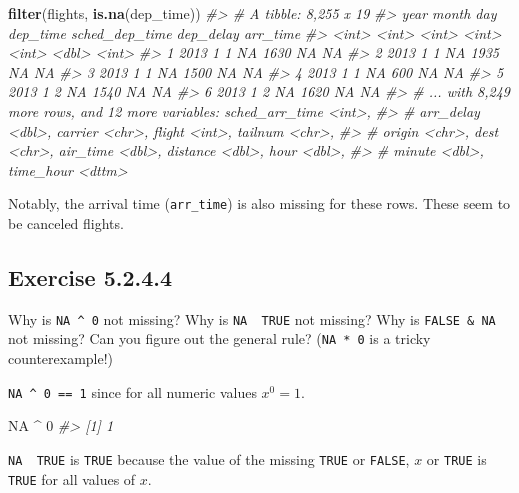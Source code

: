 \documentclass[]{book}
\newenvironment{Shaded}{\begin{snugshade}}{\end{snugshade}}
\newcommand{\CommentTok}[1]{\textcolor[rgb]{0.56,0.35,0.01}{\textit{#1}}}
\newcommand{\DecValTok}[1]{\textcolor[rgb]{0.00,0.00,0.81}{#1}}
\newcommand{\KeywordTok}[1]{\textcolor[rgb]{0.13,0.29,0.53}{\textbf{#1}}}
\newcommand{\NormalTok}[1]{#1}
\newcommand{\OperatorTok}[1]{\textcolor[rgb]{0.81,0.36,0.00}{\textbf{#1}}}
\newcommand{\OtherTok}[1]{\textcolor[rgb]{0.56,0.35,0.01}{#1}}
\newcommand{\StringTok}[1]{\textcolor[rgb]{0.31,0.60,0.02}{#1}}
\theoremstyle{plain}
\theoremstyle{remark}
\begin{document}
\begin{Shaded}
\begin{Highlighting}[]
\KeywordTok{filter}\NormalTok{(flights, }\KeywordTok{is.na}\NormalTok{(dep_time))}
\CommentTok{#> # A tibble: 8,255 x 19}
\CommentTok{#>    year month   day dep_time sched_dep_time dep_delay arr_time}
\CommentTok{#>   <int> <int> <int>    <int>          <int>     <dbl>    <int>}
\CommentTok{#> 1  2013     1     1       NA           1630        NA       NA}
\CommentTok{#> 2  2013     1     1       NA           1935        NA       NA}
\CommentTok{#> 3  2013     1     1       NA           1500        NA       NA}
\CommentTok{#> 4  2013     1     1       NA            600        NA       NA}
\CommentTok{#> 5  2013     1     2       NA           1540        NA       NA}
\CommentTok{#> 6  2013     1     2       NA           1620        NA       NA}
\CommentTok{#> # ... with 8,249 more rows, and 12 more variables: sched_arr_time <int>,}
\CommentTok{#> #   arr_delay <dbl>, carrier <chr>, flight <int>, tailnum <chr>,}
\CommentTok{#> #   origin <chr>, dest <chr>, air_time <dbl>, distance <dbl>, hour <dbl>,}
\CommentTok{#> #   minute <dbl>, time_hour <dttm>}
\end{Highlighting}
\end{Shaded}

Notably, the arrival time (\texttt{arr\_time}) is also missing for these
rows. These seem to be canceled flights.

\hypertarget{exercise-5.2.4.4}{%
\subsection*{\texorpdfstring{Exercise
{5.2.4.4}}{Exercise 5.2.4.4}}\label{exercise-5.2.4.4}}

Why is \texttt{NA\ \^{}\ 0} not missing? Why is
\texttt{NA\ \textbar{}\ TRUE} not missing? Why is \texttt{FALSE\ \&\ NA}
not missing? Can you figure out the general rule? (\texttt{NA\ *\ 0} is
a tricky counterexample!)

\texttt{NA\ \^{}\ 0\ ==\ 1} since for all numeric values \(x ^ 0 = 1\).

\begin{Shaded}
\begin{Highlighting}[]
\OtherTok{NA} \OperatorTok{^}\StringTok{ }\DecValTok{0}
\CommentTok{#> [1] 1}
\end{Highlighting}
\end{Shaded}

\texttt{NA\ \textbar{}\ TRUE} is \texttt{TRUE} because the value of the
missing \texttt{TRUE} or \texttt{FALSE}, \(x\) or \texttt{TRUE} is
\texttt{TRUE} for all values of \(x\).
\end{document}
